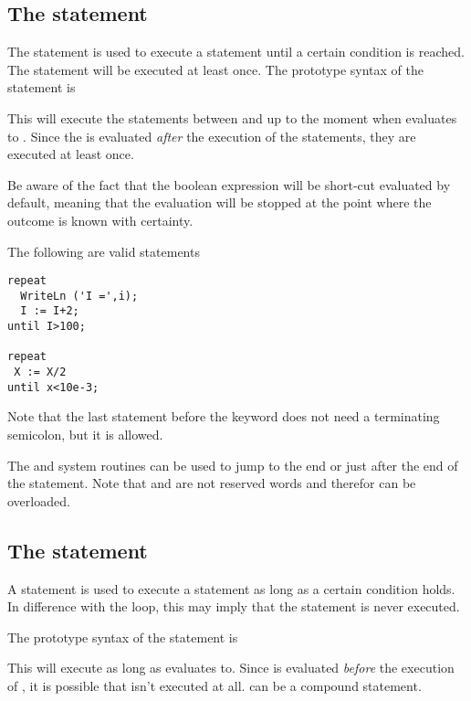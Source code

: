 \subsection{The  statement}
 
The  statement is used to execute a statement until a certain
condition is reached. The statement will be executed at least once.
The prototype syntax of the  statement is

This will execute the statements between  and  up to
the moment when  evaluates to .
Since the  is evaluated {\em after} the execution of the
statements, they are executed at least once.

Be aware of the fact that the boolean expression  will be 
short-cut evaluated by default, meaning that the evaluation will be stopped 
at the point where the outcome is known with certainty.

The following are valid  statements
\begin{verbatim}
repeat
  WriteLn ('I =',i);
  I := I+2;
until I>100;

repeat
 X := X/2
until x<10e-3;
\end{verbatim}
Note that the last statement before the  keyword does not need
a terminating semicolon, but it is allowed.

The  and  system routines can be used to jump to
the end or just after the end of the  statement.
Note that  and  are not reserved words and therefor can be overloaded.

\subsection{The  statement}
 
A  statement is used to execute a statement as long as a certain
condition holds. In difference with the  loop, this may imply 
that the statement is never executed.

The prototype syntax of the  statement is

This will execute  as long as  evaluates
to. Since  is evaluated {\em before} the execution
of , it is possible that  isn't executed at
all.  can be a compound statement.

